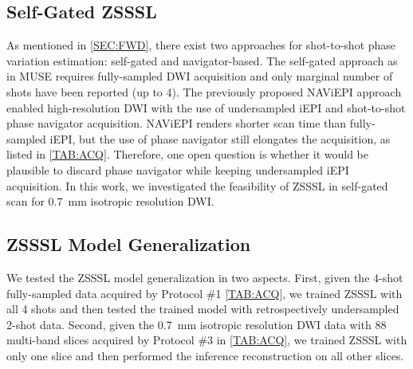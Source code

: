 \documentclass[journal,twoside,web]{ieeecolor}
\begin{document}
	\subsection{Self-Gated ZSSSL}

	As mentioned in \cref{SEC:FWD}, there exist two approaches for
	shot-to-shot phase variation estimation: self-gated and navigator-based.
	The self-gated approach as in MUSE \cite{chen_2013_muse}
	requires fully-sampled DWI acquisition and
	only marginal number of shots have been reported (up to 4).
	The previously proposed NAViEPI approach enabled high-resolution DWI
	with the use of undersampled iEPI and shot-to-shot phase navigator acquisition.
	NAViEPI renders shorter scan time than fully-sampled iEPI,
	but the use of phase navigator still elongates the acquisition,
	as listed in \cref{TAB:ACQ}.
	Therefore, one open question is whether it would be plausible to
	discard phase navigator while keeping undersampled iEPI acquisition.
	In this work, we investigated the feasibility of ZSSSL in self-gated scan
	for \SI{0.7}{\milli\meter} isotropic resolution DWI.

	\subsection{ZSSSL Model Generalization} \label{SEC:ZSSSL_GEN}

	We tested the ZSSSL model generalization in two aspects.
	First, given the 4-shot fully-sampled data acquired by
	Protocol \#1 \cref{TAB:ACQ}, we trained ZSSSL with all 4 shots
	and then tested the trained model with retrospectively undersampled 2-shot data.
	Second, given the \SI{0.7}{\milli\meter} isotropic resolution DWI data
	with 88 multi-band slices acquired by Protocol \#3 in \cref{TAB:ACQ},
	we trained ZSSSL with only one slice and
	then performed the inference reconstruction on all other slices.

\end{document}
